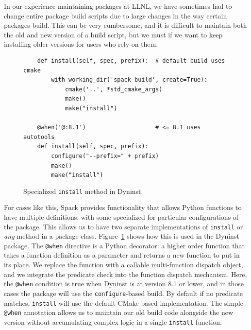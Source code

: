In our experience maintaining packages at LLNL, we have sometimes had to change
entire package build scripts due to large changes in the way certain packages build.
This can be very cumbersome, and it is difficult to maintain both the old and new
version of a build script, but we must if we want to keep installing older versions
for users who rely on them.


%
\begin{figure}
\begin{verbatim}
    def install(self, spec, prefix):  # default build uses cmake
        with working_dir('spack-build', create=True):
            cmake('..', *std_cmake_args)
            make()
            make("install")

    @when('@:8.1')                    # <= 8.1 uses autotools
    def install(self, spec, prefix):
        configure("--prefix=" + prefix)
        make()
        make("install")
\end{verbatim}
\caption{
    Specialized {\tt install} method in Dyninst.
	\label{fig:specialization}
}
\end{figure}

For cases like this, Spack provides functionality that allows Python functions to have
multiple definitions, with some specialized for particular configurations of the package.
This allows us to have two separate implementations of {\tt install} or {\it any} method
in a package class. Figure~\ref{fig:specialization} shows how this is used in the Dyninst
package.  The {\tt @when} directive is a Python decorator: a higher order function that
takes a function definition as a parameter and returns a new function to put in its place.
We replace the function with a callable multi-function dispatch object, and we
integrate the predicate check into the function dispatch mechanism.  Here, the
{\tt @when} condition is true when Dyninst is at version 8.1 or lower, and in those cases
the package will use the {\tt configure}-based build.  By default if no predicate matches,
{\tt install} will use the default CMake-based implementation. The simple {\tt @when}
annotation allows us to maintain our old build code alongside the new version without
accumulating complex logic in a single {\tt install} function.
